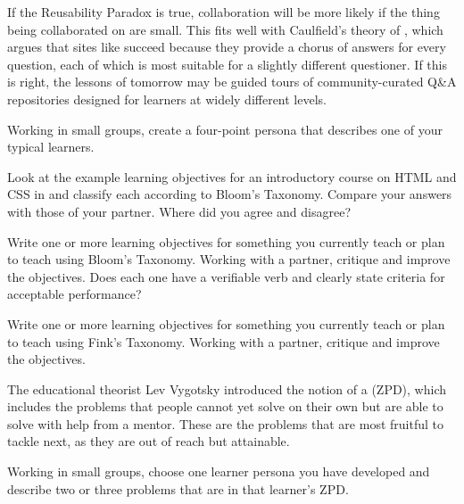 If the Reusability Paradox is true,
collaboration will be more likely
if the thing being collaborated on are small.
This fits well with Caulfield's theory of ,
which argues that sites like  succeed because
they provide a chorus of answers for every question,
each of which is most suitable for a slightly different questioner.
If this is right,
the lessons of tomorrow may be guided tours of community-curated Q\&A repositories
designed for learners at widely different levels.



Working in small groups,
create a four-point persona that describes one of your typical learners.


Look at the example learning objectives
for an introductory course on HTML and CSS in 
and classify each according to Bloom's Taxonomy.
Compare your answers with those of your partner.
Where did you agree and disagree?


Write one or more learning objectives
for something you currently teach or plan to teach
using Bloom's Taxonomy.
Working with a partner,
critique and improve the objectives.
Does each one have a verifiable verb
and clearly state criteria for acceptable performance?


Write one or more learning objectives
for something you currently teach or plan to teach
using Fink's Taxonomy.
Working with a partner,
critique and improve the objectives.


The educational theorist Lev Vygotsky introduced the notion of a  (ZPD),
which includes the problems that people cannot yet solve on their own
but are able to solve with help from a mentor.
These are the problems that are most fruitful to tackle next,
as they are out of reach but attainable.

Working in small groups,
choose one learner persona you have developed
and describe two or three problems that are in that learner's ZPD.

